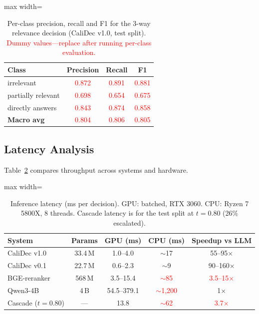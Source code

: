 \documentclass[twocolumn]{ICCKjournal}
\newcommand{\ph}[1]{\textcolor{red}{#1}}
\begin{document}
\begin{table}[H]
\caption{Per-class precision, recall and F1 for the 3-way relevance decision (CaliDec v1.0, test split). \textcolor{red}{Dummy values---replace after running per-class evaluation.}}
\label{tab:perclass}
\centering
\small
\begin{adjustbox}{max width=\linewidth}
\begin{tabular}{lccc}
\toprule
\textbf{Class} & \textbf{Precision} & \textbf{Recall} & \textbf{F1} \\
\midrule
irrelevant          & \ph{0.872} & \ph{0.891} & \ph{0.881} \\
partially relevant  & \ph{0.698} & \ph{0.654} & \ph{0.675} \\
directly answers    & \ph{0.843} & \ph{0.874} & \ph{0.858} \\
\midrule
\textbf{Macro avg}  & \ph{0.804} & \ph{0.806} & \ph{0.805} \\
\bottomrule
\end{tabular}
\end{adjustbox}
\end{table}

\subsection{Latency Analysis}
\label{sec:latency}
Table~\ref{tab:latency} compares throughput across systems and hardware.

\begin{table}[H]
\caption{Inference latency (ms per decision). GPU: batched, RTX 3060. CPU: Ryzen 7 5800X, 8 threads. Cascade latency is for the test split at $t=0.80$ (26\% escalated).}
\label{tab:latency}
\centering
\small
\begin{adjustbox}{max width=\linewidth}
\begin{tabular}{lcccc}
\toprule
\textbf{System} & \textbf{Params} & \textbf{GPU (ms)} & \textbf{CPU (ms)} & \textbf{Speedup vs LLM} \\
\midrule
CaliDec v1.0       & 33.4\,M & 1.0--4.0  & $\sim$17  & 55--95$\times$ \\
CaliDec v0.1       & 22.7\,M & 0.6--2.3  & $\sim$9   & 90--160$\times$ \\
BGE-reranker       & 568\,M  & 3.5--15.4 & \ph{$\sim$85}  & \ph{3.5--15$\times$} \\
Qwen3-4B           & 4\,B    & 54.5--379.1 & \ph{$\sim$1,200} & 1$\times$ \\
Cascade ($t=0.80$) & ---     & 13.8      & \ph{$\sim$62}  & \ph{3.7$\times$} \\
\bottomrule
\end{tabular}
\end{adjustbox}
\end{table}
\end{document}
